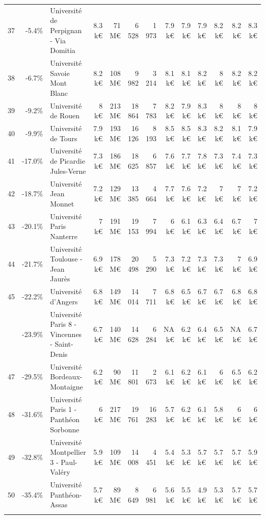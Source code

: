 \documentclass[11pt,french,landscape]{article}
\begin{document}
\begin{longtable}{rrlrrrrrrlrrr}
\rowcolor{gray!6}  37 & -5.4\% & Université de Perpignan - Via Domitia & 8.3 k€ & 71 M€ & 6 528 & 1 973 & 7.9 k€ & 7.9 k€ & 7.9 k€ & 8.2 k€ & 8.2 k€ & 8.3 k€\\
38 & -6.7\% & Université Savoie Mont Blanc & 8.2 k€ & 108 M€ & 9 982 & 3 214 & 8.1 k€ & 8.1 k€ & 8.2 k€ & 8 k€ & 8.2 k€ & 8.2 k€\\
\rowcolor{gray!6}  39 & -9.2\% & Université de Rouen & 8 k€ & 213 M€ & 18 864 & 7 783 & 8.2 k€ & 7.9 k€ & 8.3 k€ & 8 k€ & 8 k€ & 8 k€\\
40 & -9.9\% & Université de Tours & 7.9 k€ & 193 M€ & 16 126 & 8 193 & 8.5 k€ & 8.5 k€ & 8.3 k€ & 8.2 k€ & 8.1 k€ & 7.9 k€\\
\addlinespace
\rowcolor{gray!6}  41 & -17.0\% & Université de Picardie Jules-Verne & 7.3 k€ & 186 M€ & 18 625 & 6 857 & 7.6 k€ & 7.7 k€ & 7.8 k€ & 7.3 k€ & 7.4 k€ & 7.3 k€\\
42 & -18.7\% & Université Jean Monnet & 7.2 k€ & 129 M€ & 13 385 & 4 664 & 7.7 k€ & 7.6 k€ & 7.2 k€ & 7 k€ & 7 k€ & 7.2 k€\\
\rowcolor{gray!6}  43 & -20.1\% & Université Paris Nanterre & 7 k€ & 191 M€ & 19 153 & 7 994 & 6 k€ & 6.1 k€ & 6.3 k€ & 6.4 k€ & 6.7 k€ & 7 k€\\
44 & -21.7\% & Université Toulouse - Jean Jaurès & 6.9 k€ & 178 M€ & 20 498 & 5 290 & 7.3 k€ & 7.2 k€ & 7.3 k€ & 7.3 k€ & 7 k€ & 6.9 k€\\
\rowcolor{gray!6}  45 & -22.2\% & Université d'Angers & 6.8 k€ & 149 M€ & 14 014 & 7 711 & 6.8 k€ & 6.5 k€ & 6.7 k€ & 6.7 k€ & 6.8 k€ & 6.8 k€\\
\addlinespace
46 & -23.9\% & Université Paris 8 - Vincennes - Saint-Denis & 6.7 k€ & 140 M€ & 14 628 & 6 284 & NA k€ & 6.2 k€ & 6.4 k€ & 6.5 k€ & NA k€ & 6.7 k€\\
\rowcolor{gray!6}  47 & -29.5\% & Université Bordeaux-Montaigne & 6.2 k€ & 90 M€ & 11 801 & 2 673 & 6.1 k€ & 6.2 k€ & 6.1 k€ & 6 k€ & 6.5 k€ & 6.2 k€\\
48 & -31.6\% & Université Paris 1 - Panthéon Sorbonne & 6 k€ & 217 M€ & 19 761 & 16 283 & 5.7 k€ & 6.2 k€ & 6.1 k€ & 5.8 k€ & 6 k€ & 6 k€\\
\rowcolor{gray!6}  49 & -32.8\% & Université Montpellier 3 - Paul-Valéry & 5.9 k€ & 109 M€ & 14 008 & 4 451 & 5.4 k€ & 5.3 k€ & 5.7 k€ & 5.7 k€ & 5.7 k€ & 5.9 k€\\
50 & -35.4\% & Université Panthéon-Assas & 5.7 k€ & 89 M€ & 8 649 & 6 981 & 5.6 k€ & 5.5 k€ & 4.9 k€ & 5.3 k€ & 5.7 k€ & 5.7 k€\\
\addlinespace

\end{longtable}
\end{document}
